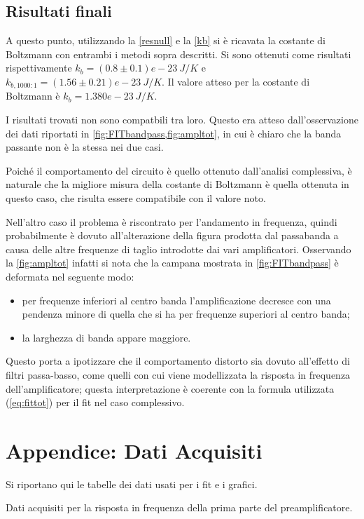 \documentclass[a4paper,10pt]{article}
\begin{document}
\subsection{Risultati finali}
A questo punto, utilizzando la \eqref{resnull} e la \eqref{kb} si è ricavata la costante di Boltzmann con entrambi i metodi sopra descritti. Si sono ottenuti come risultati rispettivamente $k_b = (0.8\pm0.1)e-23~J/K$ e $k_{b,1000:1} = (1.56\pm0.21)e-23~J/K $. Il valore atteso per la costante di Boltzmann è $k_b = 1.380e-23~J/K$.
\newline

I risultati trovati non sono compatbili tra loro. Questo era atteso dall'osservazione dei dati riportati in \cref{fig:FITbandpass,fig:ampltot}, in cui è chiaro che la banda passante non è la stessa nei due casi.

Poiché il comportamento del circuito è quello ottenuto dall'analisi complessiva, è naturale che la migliore misura della costante di Boltzmann è quella ottenuta in questo caso, che risulta essere compatibile con il valore noto.

Nell'altro caso il problema è riscontrato per l'andamento in frequenza, quindi probabilmente è dovuto all'alterazione della figura prodotta dal passabanda a causa delle altre frequenze di taglio introdotte dai vari amplificatori.
Osservando la \cref{fig:ampltot} infatti si nota che la campana mostrata in \cref{fig:FITbandpass} è deformata nel seguente modo:
\begin{itemize}
	\item per frequenze inferiori al centro banda l'amplificazione decresce con una pendenza minore di quella che si ha per frequenze superiori al centro banda;
	\item la larghezza di banda appare maggiore.
\end{itemize}
Questo porta a ipotizzare che il comportamento distorto sia dovuto all'effetto di filtri passa-basso, come quelli con cui viene modellizzata la risposta in frequenza dell'amplificatore; questa interpretazione è coerente con la formula utilizzata (\cref{eq:fittot}) per il fit nel caso complessivo.

\pagebreak

\section{Appendice: Dati Acquisiti}
Si riportano qui le tabelle dei dati usati per i fit e i grafici.

\begin{table}[H]
	\centering
	
	\caption{Dati acquisiti per la risposta in frequenza della prima parte del preamplificatore.}
	\label{tab:prepreamp}
\end{table}
\end{document}

